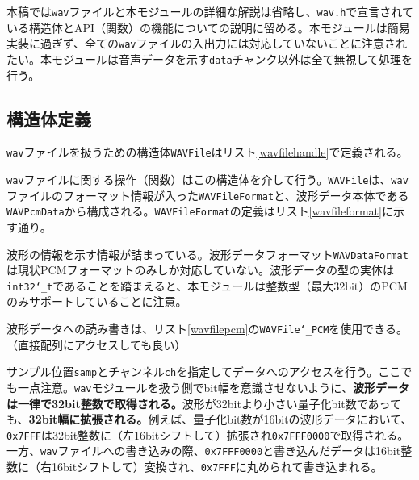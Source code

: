 \documentclass[uplatex,dvipdfmx,b5j,10pt]{jsbook}
\theoremstyle{definition}
\begin{document}
本稿では\texttt{wav}ファイルと本モジュールの詳細な解説は省略し、\texttt{wav.h}で宣言されている構造体とAPI（関数）の機能についての説明に留める。本モジュールは簡易実装に過ぎず、全ての\texttt{wav}ファイルの入出力には対応していないことに注意されたい。本モジュールは音声データを示す\texttt{data}チャンク以外は全て無視して処理を行う。

\subsection{構造体定義} \label{struct_wavfile}

\texttt{wav}ファイルを扱うための構造体\texttt{WAVFile}はリスト\ref{wavfilehandle}で定義される。


\texttt{wav}ファイルに関する操作（関数）はこの構造体を介して行う。\texttt{WAVFile}は、\texttt{wav}ファイルのフォーマット情報が入った\texttt{WAVFileFormat}と、波形データ本体である\texttt{WAVPcmData}から構成される。\texttt{WAVFileFormat}の定義はリスト\ref{wavfileformat}に示す通り。


波形の情報を示す情報が詰まっている。波形データフォーマット\texttt{WAVDataFormat}は現状PCMフォーマットのみしか対応していない。波形データの型の実体は\texttt{int32\char`_t}であることを踏まえると、本モジュールは整数型（最大32bit）のPCMのみサポートしていることに注意。

波形データへの読み書きは、リスト\ref{wavfilepcm}の\texttt{WAVFile\char`_PCM}を使用できる。（直接配列にアクセスしても良い）


サンプル位置\texttt{samp}とチャンネル\texttt{ch}を指定してデータへのアクセスを行う。ここでも一点注意。\texttt{wav}モジュールを扱う側でbit幅を意識させないように、\textbf{波形データは一律で32bit整数で取得される。}波形が32bitより小さい量子化bit数であっても、\textbf{32bit幅に拡張される。}例えば、量子化bit数が16bitの波形データにおいて、\texttt{0x7FFF}は32bit整数に（左16bitシフトして）拡張され\texttt{0x7FFF0000}で取得される。一方、\texttt{wav}ファイルへの書き込みの際、\texttt{0x7FFF0000}と書き込んだデータは16bit整数に（右16bitシフトして）変換され、\texttt{0x7FFF}に丸められて書き込まれる。
\end{document}
